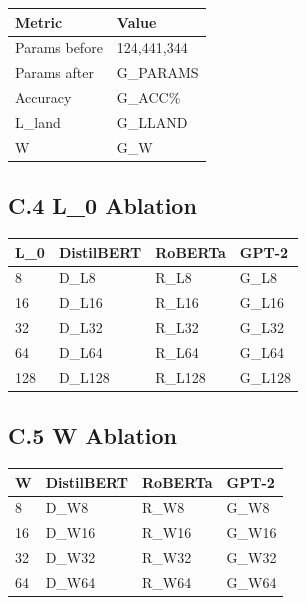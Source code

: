 \begin{table}[H]
\centering
\small
\begin{tabular}{ll}
\toprule
\textbf{Metric} & \textbf{Value} \\
\midrule
Params before & 124,441,344 \\
Params after & {{G\_PARAMS}} \\
Accuracy & {{G\_ACC}}\% \\
L\_land & {{G\_LLAND}} \\
W & {{G\_W}} \\
\bottomrule
\end{tabular}
\end{table}

\subsection{C.4 L\_0 Ablation}

\begin{table}[H]
\centering
\small
\begin{tabular}{llll}
\toprule
\textbf{L\_0} & \textbf{DistilBERT} & \textbf{RoBERTa} & \textbf{GPT-2} \\
\midrule
8 & {{D\_L8}} & {{R\_L8}} & {{G\_L8}} \\
16 & {{D\_L16}} & {{R\_L16}} & {{G\_L16}} \\
32 & {{D\_L32}} & {{R\_L32}} & {{G\_L32}} \\
64 & {{D\_L64}} & {{R\_L64}} & {{G\_L64}} \\
128 & {{D\_L128}} & {{R\_L128}} & {{G\_L128}} \\
\bottomrule
\end{tabular}
\end{table}

\subsection{C.5 W Ablation}

\begin{table}[H]
\centering
\small
\begin{tabular}{llll}
\toprule
\textbf{W} & \textbf{DistilBERT} & \textbf{RoBERTa} & \textbf{GPT-2} \\
\midrule
8 & {{D\_W8}} & {{R\_W8}} & {{G\_W8}} \\
16 & {{D\_W16}} & {{R\_W16}} & {{G\_W16}} \\
32 & {{D\_W32}} & {{R\_W32}} & {{G\_W32}} \\
64 & {{D\_W64}} & {{R\_W64}} & {{G\_W64}} \\
\bottomrule
\end{tabular}
\end{table}

